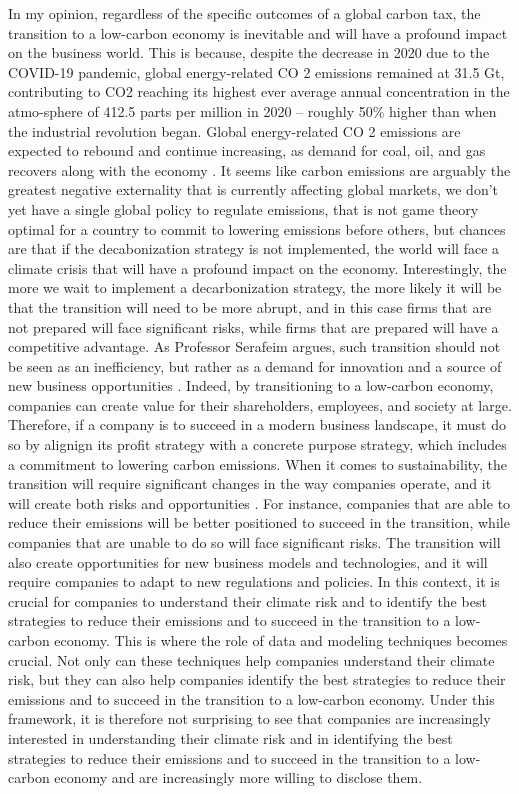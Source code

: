 \noindent In my opinion, regardless of the specific outcomes of a global carbon tax, the transition to a low-carbon economy is inevitable and will have a profound impact on the business world. This is because, despite the decrease in 2020 due to the COVID-19 pandemic, global energy-related CO 2 emissions remained at 31.5 Gt, contributing to CO2 reaching its highest ever average annual concentration in the atmo-sphere of 412.5 parts per million in 2020 – roughly 50\% higher than when the industrial revolution began. Global energy-related CO 2 emissions are expected to rebound and continue increasing, as demand for coal, oil, and gas recovers along with the economy \cite{BHATT2023100095}. It seems like carbon emissions are arguably the greatest negative externality that is currently affecting global markets, we don't yet have a single global policy to regulate emissions, that is not game theory optimal for a country to commit to lowering emissions before others, but chances are that if the decabonization strategy is not implemented, the world will face a climate crisis that will have a profound impact on the economy. Interestingly, the more we wait to implement a decarbonization strategy, the more likely it will be that the transition will need to be more abrupt, and in this case firms that are not prepared will face significant risks, while firms that are prepared will have a competitive advantage. As Professor Serafeim argues, such transition should not be seen as an inefficiency, but rather as a demand for innovation and a source of new business opportunities \cite{purpose+profit}. Indeed, by transitioning to a low-carbon economy, companies can create value for their shareholders, employees, and society at large. Therefore, if a company is to succeed in a modern business landscape, it must do so by alignign its profit strategy with a concrete purpose strategy, which includes a commitment to lowering carbon emissions. When it comes to sustainability, the transition will require significant changes in the way companies operate, and it will create both risks and opportunities \cite{purpose+profit}. For instance, companies that are able to reduce their emissions will be better positioned to succeed in the transition, while companies that are unable to do so will face significant risks. The transition will also create opportunities for new business models and technologies, and it will require companies to adapt to new regulations and policies. In this context, it is crucial for companies to understand their climate risk and to identify the best strategies to reduce their emissions and to succeed in the transition to a low-carbon economy. This is where the role of data and modeling techniques becomes crucial. Not only can these techniques help companies understand their climate risk, but they can also help companies identify the best strategies to reduce their emissions and to succeed in the transition to a low-carbon economy. Under this framework, it is therefore not surprising to see that companies are increasingly interested in understanding their climate risk and in identifying the best strategies to reduce their emissions and to succeed in the transition to a low-carbon economy and are increasingly more willing to disclose them.

